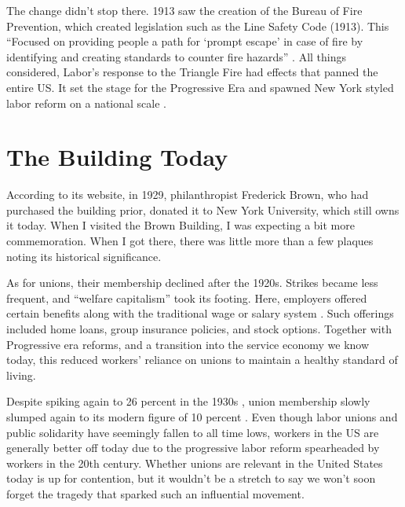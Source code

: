 \documentclass[12pt]{article}
\begin{document}
The change didn't stop there. 1913 saw the creation of the Bureau of Fire
Prevention, which created legislation such as the Line Safety Code (1913). This
``Focused on providing people a path for `prompt escape' in case of fire by
identifying and creating standards to counter fire hazards''
\parencite[7]{martineztriangle}. All things considered, Labor's response to the
Triangle Fire had effects that panned the entire US. It set the stage for
the Progressive Era and spawned New York styled labor reform on a national
scale \parencite{Ev1995}. 

\section{The Building Today}

According to its website, in 1929, philanthropist Frederick Brown, who had
purchased the building prior, donated it to New York University, which still
owns it today. When I visited the Brown Building, I was expecting a bit more
commemoration. When I got there, there was little more than a few plaques noting
its historical significance.

As for unions, their membership declined after the 1920s. Strikes became less
frequent, and ``welfare capitalism'' took its footing. Here, employers
offered certain benefits along with the traditional wage or salary system
\parencite{WorkingClass}. Such offerings included home loans, group
insurance policies, and stock options. Together with Progressive era reforms,
and a transition into the service economy we know today,
this reduced workers' reliance on unions to maintain a healthy standard of
living.

Despite spiking again to 26 percent in the 1930s \parencite{WorkingClass}, union
membership slowly slumped again to its modern figure of 10 percent
\parencite{indexes2018bureau}. Even though labor unions and public solidarity have
seemingly fallen to all time lows, workers in the US are generally better off
today due to the progressive labor reform spearheaded by workers in the 20th
century. Whether unions are relevant in the United States today is up for contention, but
it wouldn't be a stretch to say we won't soon forget the tragedy that sparked such an influential
movement.


  \newpage
  \printbibliography
\end{document}
